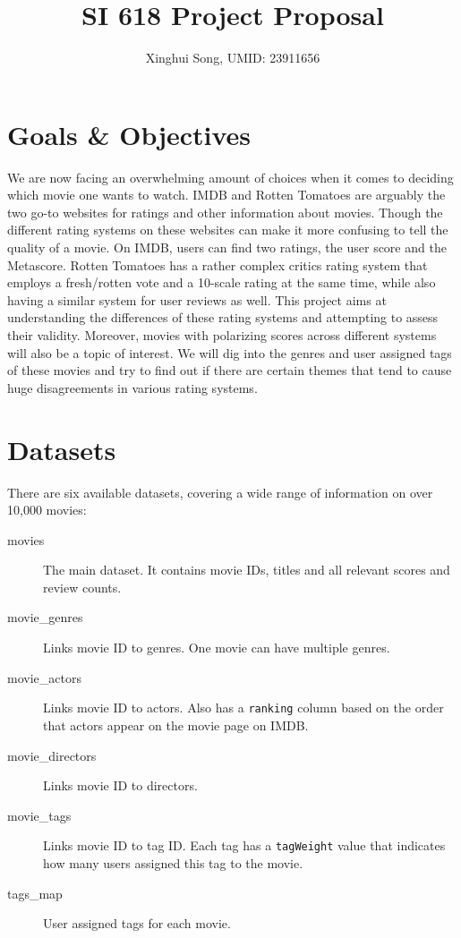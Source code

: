 \documentclass[11pt]{article}
\begin{document}
\title{SI 618 Project Proposal}
\author{Xinghui Song, UMID: 23911656}
\date{}
\maketitle

\section*{Goals \& Objectives}

We are now facing an overwhelming amount of choices when it comes to deciding which movie one wants to watch. IMDB and Rotten Tomatoes are arguably the two go-to websites for ratings and other information about movies. Though the different rating systems on these websites can make it more confusing to tell the quality of a movie. On IMDB, users can find two ratings, the user score and the Metascore. Rotten Tomatoes has a rather complex critics rating system that employs a fresh/rotten vote and a 10-scale rating at the same time, while also having a similar system for user reviews as well. This project aims at understanding the differences of these rating systems and attempting to assess their validity. Moreover, movies with polarizing scores across different systems will also be a topic of interest. We will dig into the genres and user assigned tags of these movies and try to find out if there are certain themes that tend to cause huge disagreements in various rating systems. 

\section*{Datasets}

There are six available datasets, covering a wide range of information on over 10,000 movies:

\begin{description}
	\item [movies] The main dataset. It contains movie IDs, titles and all relevant scores and review counts.
	\item [movie\_genres] Links movie ID to genres. One movie can have multiple genres.
	\item [movie\_actors] Links movie ID to actors. Also has a {\tt ranking} column based on the order that actors appear on the movie page on IMDB. 
	\item [movie\_directors] Links movie ID to directors. 
	\item [movie\_tags] Links movie ID to tag ID. Each tag has a {\tt tagWeight} value that indicates how many users assigned this tag to the movie. 
	\item [tags\_map] User assigned tags for each movie.
\end{description} 
\end{document}
